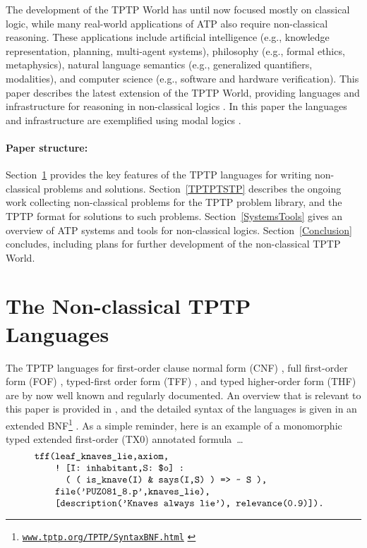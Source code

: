 \documentclass[runningheads]{llncs}
\begin{document}
The development of the TPTP World has until now focused mostly on classical logic, while many 
real-world applications of ATP also require non-classical reasoning. 
These applications include artificial intelligence (e.g., knowledge representation, planning, 
multi-agent systems), philosophy (e.g., formal ethics, metaphysics), natural language semantics 
(e.g., generalized quantifiers, modalities), and computer science (e.g., software and hardware 
verification).
This paper describes the latest extension of the TPTP World, providing languages and
infrastructure for reasoning in non-classical logics \cite{Pri08,Gob01}.
In this paper the languages and infrastructure are exemplified using modal logics \cite{BBW06}.

\paragraph{Paper structure:}
Section~\ref{TPTPLanguages} provides the key features of the TPTP languages for writing
non-classical problems and solutions. 
Section~\ref{TPTPTSTP} describes the ongoing work collecting non-classical problems for the TPTP
problem library, and the TPTP format for solutions to such problems.
Section~\ref{SystemsTools} gives an overview of ATP systems and tools for non-classical logics.
Section~\ref{Conclusion} concludes, including plans for further development of the non-classical
TPTP World.

\section{The Non-classical TPTP Languages}
\label{TPTPLanguages}

The TPTP languages for first-order clause normal form (CNF) \cite{SS98-JAR}, full first-order 
form (FOF) \cite{Sut09}, typed-first order form (TFF) \cite{SS+12,BP13-TFF1}, and typed 
higher-order form (THF) \cite{SB10,KSR16} are by now well known and regularly documented.
An overview that is relevant to this paper is provided in \cite{SF+22}, and the detailed
syntax of the languages is given in an extended BNF\footnote{%
\href{https://www.tptp.org/TPTP/SyntaxBNF.html}{\tt www.tptp.org/TPTP/SyntaxBNF.html}
\label{BNF}} \cite{VS06}.
As a simple reminder, here is an example of a monomorphic typed extended first-order (TX0) 
annotated formula~\ldots
\[
\begin{minipage}{\textwidth}
\begin{verbatim}
    tff(leaf_knaves_lie,axiom,
        ! [I: inhabitant,S: $o] : 
          ( ( is_knave(I) & says(I,S) ) => ~ S ),
        file('PUZ081_8.p',knaves_lie),
        [description('Knaves always lie'), relevance(0.9)]).
\end{verbatim}
\end{minipage}
\]
\end{document}
